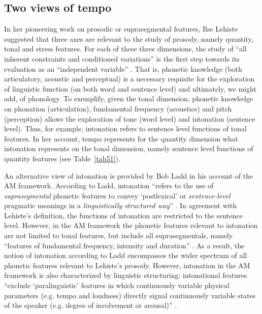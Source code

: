 \subsection{Two views of tempo}\label{sec511}
In her pioneering work on prosodic or suprasegmental features, Ilse Lehiste suggested that three axes are relevant to the study of prosody, namely quantity, tonal and stress features. For each of these three dimensions, the study of ``all inherent constraints and conditioned variations'' is the first step towards its evaluation as an ``independent variable'' \cite[3]{lehiste1970suprasegmentals}. That is, phonetic knowledge (both articulatory, acoustic and perceptual) is a necessary requisite for the exploration of linguistic function (on both word and sentence level) and ultimately, we might add, of phonology. To exemplify, given the tonal dimension, phonetic knowledge on phonation (articulation), fundamental frequency (acoustics) and pitch (perception) allows the exploration of tone (word level) and intonation (sentence level). Thus, for example, intonation refers to sentence level functions of tonal features. In her account, tempo represents for the quantity dimension what intonation represents on the tonal dimension, namely sentence level functions of quantity features (see  Table~\ref{tab51}).

An alternative view of intonation is provided by Bob Ladd in his account of the AM framework. According to Ladd, intonation ``refers to the use of \textit{suprasegmental} phonetic features to convey `postlexical' or \textit{sentence-level} pragmatic meanings in a \textit{linguistically structured way}'' \cite[4; original emphasis]{ladd2008intonational}. In agreement with Lehiste's definition, the functions of intonation are restricted to the sentence level. However, in the AM framework the phonetic features relevant to intonation are not limited to tonal features, but include all suprasegmentals, namely ``features of fundamental frequency, intensity and duration'' \cite[ibid.]{ladd2008intonational}. As a result, the notion of intonation according to Ladd encompasses the wider spectrum of all phonetic features relevant to Lehiste's prosody. However, intonation in the AM framework is also characterized by linguistic structuring: intonational features ``exclude `paralinguistic' features in which continuously variable physical parameters (e.g. tempo and loudness) directly signal continuously variable states of the speaker (e.g. degree of involvement or arousal)'' \cite[6]{ladd2008intonational}. 


